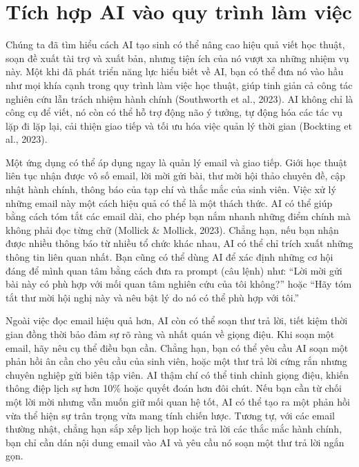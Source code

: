 \section{Tích hợp AI vào quy trình làm việc}

Chúng ta đã tìm hiểu cách AI tạo sinh có thể nâng cao hiệu quả viết học thuật, soạn đề xuất tài trợ và xuất bản, nhưng tiện ích của nó vượt xa những nhiệm vụ này. Một khi đã phát triển năng lực hiểu biết về AI, bạn có thể đưa nó vào hầu như mọi khía cạnh trong quy trình làm việc học thuật, giúp tinh giản cả công tác nghiên cứu lẫn trách nhiệm hành chính (Southworth et al., 2023). AI không chỉ là công cụ để viết, nó còn có thể hỗ trợ động não ý tưởng, tự động hóa các tác vụ lặp đi lặp lại, cải thiện giao tiếp và tối ưu hóa việc quản lý thời gian (Bockting et al., 2023).

Một ứng dụng có thể áp dụng ngay là quản lý email và giao tiếp. Giới học thuật liên tục nhận được vô số email, lời mời gửi bài, thư mời hội thảo chuyên đề, cập nhật hành chính, thông báo của tạp chí và thắc mắc của sinh viên. Việc xử lý những email này một cách hiệu quả có thể là một thách thức. AI có thể giúp bằng cách tóm tắt các email dài, cho phép bạn nắm nhanh những điểm chính mà không phải đọc từng chữ (Mollick \& Mollick, 2023). Chẳng hạn, nếu bạn nhận được nhiều thông báo từ nhiều tổ chức khác nhau, AI có thể chỉ trích xuất những thông tin liên quan nhất. Bạn cũng có thể dùng AI để xác định những cơ hội đáng để mình quan tâm bằng cách đưa ra prompt (câu lệnh) như: ``Lời mời gửi bài này có phù hợp với mối quan tâm nghiên cứu của tôi không?'' hoặc ``Hãy tóm tắt thư mời hội nghị này và nêu bật lý do nó có thể phù hợp với tôi.''

Ngoài việc đọc email hiệu quả hơn, AI còn có thể soạn thư trả lời, tiết kiệm thời gian đồng thời bảo đảm sự rõ ràng và nhất quán về giọng điệu. Khi soạn một email, hãy nêu cụ thể điều bạn cần. Chẳng hạn, bạn có thể yêu cầu AI soạn một phản hồi ân cần cho yêu cầu của sinh viên, hoặc một thư trả lời cứng rắn nhưng chuyên nghiệp gửi biên tập viên. AI thậm chí có thể tinh chỉnh giọng điệu, khiến thông điệp lịch sự hơn 10\% hoặc quyết đoán hơn đôi chút. Nếu bạn cần từ chối một lời mời nhưng vẫn muốn giữ mối quan hệ tốt, AI có thể tạo ra một phản hồi vừa thể hiện sự trân trọng vừa mang tính chiến lược. Tương tự, với các email thường nhật, chẳng hạn sắp xếp lịch họp hoặc trả lời các thắc mắc hành chính, bạn chỉ cần dán nội dung email vào AI và yêu cầu nó soạn một thư trả lời ngắn gọn.

